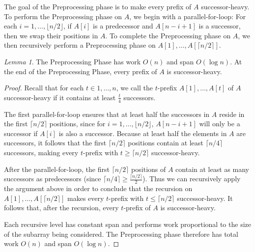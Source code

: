 \documentclass[11pt]{article}
\renewcommand{\paragraph}[1]{\vspace{0.09in}\noindent{\bf \boldmath #1.}}
\theoremstyle{remark}
\newtheorem{lemma}[thm]{Lemma}
\theoremstyle{remark}
\begin{document}
\paragraph{A Preprocessing Phase}
The goal of the Preprocessing phase is to make every prefix of $A$
successor-heavy. To perform the Preprocessing phase on $A$, we begin
with a parallel-for-loop: For each $i = 1, \ldots, \lfloor n /
2\rfloor$, if $A[i]$ is a predecessor and $A[n - i + 1]$ is a
successor, then we swap their positions in $A$. To complete the
Preprocessing phase on $A$, we then recursively perform a
Preprocessing phase on $A[1], \ldots, A[\lceil n / 2 \rceil]$.

\begin{lemma}
 The Preprocessing Phase has work $O(n)$ and span $O(\log n)$. At the
 end of the Preprocessing Phase, every prefix of $A$ is
 successor-heavy.
  \label{lem:preprocessingphase}
\end{lemma}
\begin{proof}
Recall that for each $t \in 1, \ldots, n$, we call the $t$-prefix
$A[1], \ldots, A[t]$ of $A$ successor-heavy if it contains at least
$\frac{t}{4}$ successors.

The first parallel-for-loop ensures that at least half the successors
in $A$ reside in the first $\lceil n / 2 \rceil$ positions, since for
$i = 1, \ldots, \lfloor n / 2 \rfloor$, $A[n - i + 1]$ will only be a
successor if $A[i]$ is also a successor. Because at least half the
elements in $A$ are successors, it follows that the first $\lceil n /
2 \rceil$ positions contain at least $\lceil n / 4\rceil$ successors,
making every $t$-prefix with $t \ge \lceil n / 2 \rceil$
successor-heavy.

After the parallel-for-loop, the first $\lceil n / 2 \rceil$ positions
of $A$ contain at least as many successors as predecessors (since
$\lceil n / 4 \rceil \ge \frac{\lceil n / 2 \rceil}{2}$). Thus we can
recursively apply the argument above in order to conclude that the
recursion on $A[1], \ldots, A[\lceil n / 2 \rceil]$ makes every
$t$-prefix with $t \le \lceil n / 2 \rceil$ successor-heavy. It
follows that, after the recursion, every $t$-prefix of $A$ is
successor-heavy.

Each recursive level has constant span and performs work proportional
to the size of the subarray being considered. The Preprocessing phase
therefore has total work $O(n)$ and span $O(\log n)$.
\end{proof}


\end{document}
